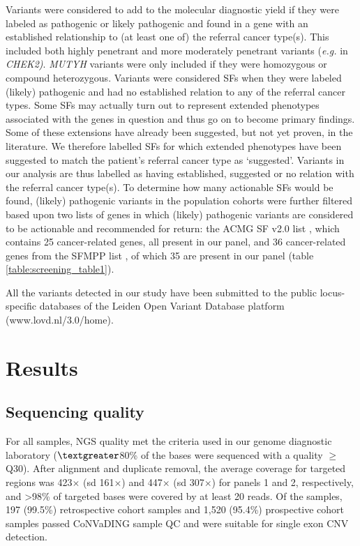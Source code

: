 Variants were considered to add to the molecular diagnostic yield if they were labeled as pathogenic or likely pathogenic and found in a gene with an established relationship to (at least one of) the referral cancer type(s). This included both highly penetrant and more moderately penetrant variants (\textsl{e.g.} in \textsl{CHEK2)}. 
\textsl{MUTYH} variants were only included if they were homozygous or compound heterozygous. 
Variants were considered SFs when they were labeled (likely) pathogenic and had no established relation to any of the referral cancer types. 
Some SFs may actually turn out to represent extended phenotypes associated with the genes in question and thus go on to become primary findings. 
Some of these extensions have already been suggested, but not yet proven, in the literature. We therefore labelled SFs for which extended phenotypes have been suggested to match the patient’s referral cancer type as ‘suggested’. 
Variants in our analysis are thus labelled as having established, suggested or no relation with the referral cancer type(s). 
To determine how many actionable SFs would be found, (likely) pathogenic variants in the population cohorts were further filtered based upon two lists of genes in which (likely) pathogenic variants are considered to be actionable and recommended for return: the ACMG SF v2.0 list \cite{Kalia_2016}, which contains 25 cancer-related genes, all present in our panel, and 36 cancer-related genes from the SFMPP list \cite{Pujol_2018}, of which 35 are present in our panel (table \ref{table:screening_table1}).

All the variants detected in our study have been submitted to the public locus-specific databases of the Leiden Open Variant Database platform (www.lovd.nl/3.0/home). 

\section{Results}
\subsection{Sequencing quality}
For all samples, NGS quality met the criteria used in our genome diagnostic laboratory ($\textgreater$80\% of the bases were sequenced with a quality $\ge$Q30). 
After alignment and duplicate removal, the average coverage for targeted regions was 423$\times$ (sd 161$\times$) and 447$\times$ (sd 307$\times$) for panels 1 and 2, respectively, and \textgreater98\% of targeted bases were covered by at least 20 reads. 
Of the samples, 197 (99.5\%) retrospective cohort samples and 1,520 (95.4\%) prospective cohort samples passed CoNVaDING sample QC and were suitable for single exon CNV detection.     

